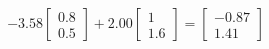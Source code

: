 \documentclass[preview]{standalone}
\begin{document}
\begin{align*}
-3.58 \begin{bmatrix} 0.8 \\ 0.5 \end{bmatrix} + 2.00 \begin{bmatrix} 1 \\ 1.6 \end{bmatrix} = \begin{bmatrix} -0.87 \\ 1.41 \end{bmatrix}
\end{align*}
\end{document}
